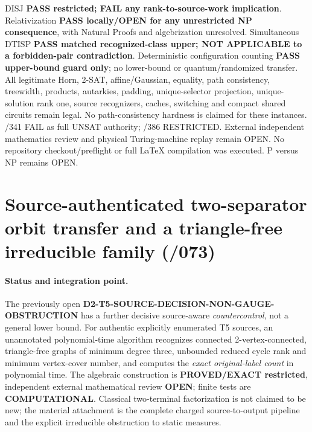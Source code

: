 \documentclass[11pt]{article}
\begin{document}
DISJ \textbf{PASS restricted; FAIL any rank-to-source-work implication}. Relativization \textbf{PASS locally/OPEN for any unrestricted NP consequence}, with Natural Proofs and algebrization unresolved. Simultaneous DTISP \textbf{PASS matched recognized-class upper; NOT APPLICABLE to a forbidden-pair contradiction}. Deterministic configuration counting \textbf{PASS upper-bound guard only}; no lower-bound or quantum/randomized transfer. All legitimate Horn, 2-SAT, affine/Gaussian, equality, path consistency, treewidth, products, autarkies, padding, unique-selector projection, unique-solution rank one, source recognizers, caches, switching and compact shared circuits remain legal. No path-consistency hardness is claimed for these instances. /341 FAIL as full UNSAT authority; /386 RESTRICTED. External independent mathematics review and physical Turing-machine replay remain OPEN. No repository checkout/preflight or full LaTeX compilation was executed. P versus NP remains OPEN.


\section{Source-authenticated two-separator orbit transfer and a triangle-free irreducible family (/073)}
\paragraph{Status and integration point.}
The previously open \textbf{D2-T5-SOURCE-DECISION-NON-GAUGE-OBSTRUCTION}
has a further decisive source-aware \emph{countercontrol}, not a
general lower bound. For authentic explicitly enumerated T5 sources,
an unannotated polynomial-time algorithm recognizes connected
2-vertex-connected, triangle-free graphs of minimum degree three,
unbounded reduced cycle rank and minimum vertex-cover number,
and computes the \emph{exact original-label count} in polynomial
time. The algebraic construction is \textbf{PROVED/EXACT restricted},
independent external mathematical review \textbf{OPEN}; finite
tests are \textbf{COMPUTATIONAL}.
Classical two-terminal factorization is not claimed to be new;
the material attachment is the complete charged source-to-output
pipeline and the explicit irreducible obstruction to static measures.
\end{document}
